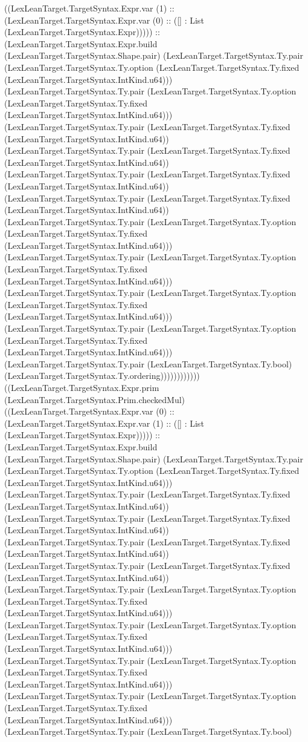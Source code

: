 \documentclass[11pt]{article}
\begin{document}
((LexLeanTarget.TargetSyntax.Expr.var (1) :: (LexLeanTarget.TargetSyntax.Expr.var (0) :: ([] : List (LexLeanTarget.TargetSyntax.Expr))))) :: (LexLeanTarget.TargetSyntax.Expr.build (LexLeanTarget.TargetSyntax.Shape.pair) (LexLeanTarget.TargetSyntax.Ty.pair (LexLeanTarget.TargetSyntax.Ty.option (LexLeanTarget.TargetSyntax.Ty.fixed (LexLeanTarget.TargetSyntax.IntKind.u64))) (LexLeanTarget.TargetSyntax.Ty.pair (LexLeanTarget.TargetSyntax.Ty.option (LexLeanTarget.TargetSyntax.Ty.fixed (LexLeanTarget.TargetSyntax.IntKind.u64))) (LexLeanTarget.TargetSyntax.Ty.pair (LexLeanTarget.TargetSyntax.Ty.fixed (LexLeanTarget.TargetSyntax.IntKind.u64)) (LexLeanTarget.TargetSyntax.Ty.pair (LexLeanTarget.TargetSyntax.Ty.fixed (LexLeanTarget.TargetSyntax.IntKind.u64)) (LexLeanTarget.TargetSyntax.Ty.pair (LexLeanTarget.TargetSyntax.Ty.fixed (LexLeanTarget.TargetSyntax.IntKind.u64)) (LexLeanTarget.TargetSyntax.Ty.pair (LexLeanTarget.TargetSyntax.Ty.fixed (LexLeanTarget.TargetSyntax.IntKind.u64)) (LexLeanTarget.TargetSyntax.Ty.pair (LexLeanTarget.TargetSyntax.Ty.option (LexLeanTarget.TargetSyntax.Ty.fixed (LexLeanTarget.TargetSyntax.IntKind.u64))) (LexLeanTarget.TargetSyntax.Ty.pair (LexLeanTarget.TargetSyntax.Ty.option (LexLeanTarget.TargetSyntax.Ty.fixed (LexLeanTarget.TargetSyntax.IntKind.u64))) (LexLeanTarget.TargetSyntax.Ty.pair (LexLeanTarget.TargetSyntax.Ty.option (LexLeanTarget.TargetSyntax.Ty.fixed (LexLeanTarget.TargetSyntax.IntKind.u64))) (LexLeanTarget.TargetSyntax.Ty.pair (LexLeanTarget.TargetSyntax.Ty.option (LexLeanTarget.TargetSyntax.Ty.fixed (LexLeanTarget.TargetSyntax.IntKind.u64))) (LexLeanTarget.TargetSyntax.Ty.pair (LexLeanTarget.TargetSyntax.Ty.bool) (LexLeanTarget.TargetSyntax.Ty.ordering)))))))))))) ((LexLeanTarget.TargetSyntax.Expr.prim (LexLeanTarget.TargetSyntax.Prim.checkedMul) ((LexLeanTarget.TargetSyntax.Expr.var (0) :: (LexLeanTarget.TargetSyntax.Expr.var (1) :: ([] : List (LexLeanTarget.TargetSyntax.Expr))))) :: (LexLeanTarget.TargetSyntax.Expr.build (LexLeanTarget.TargetSyntax.Shape.pair) (LexLeanTarget.TargetSyntax.Ty.pair (LexLeanTarget.TargetSyntax.Ty.option (LexLeanTarget.TargetSyntax.Ty.fixed (LexLeanTarget.TargetSyntax.IntKind.u64))) (LexLeanTarget.TargetSyntax.Ty.pair (LexLeanTarget.TargetSyntax.Ty.fixed (LexLeanTarget.TargetSyntax.IntKind.u64)) (LexLeanTarget.TargetSyntax.Ty.pair (LexLeanTarget.TargetSyntax.Ty.fixed (LexLeanTarget.TargetSyntax.IntKind.u64)) (LexLeanTarget.TargetSyntax.Ty.pair (LexLeanTarget.TargetSyntax.Ty.fixed (LexLeanTarget.TargetSyntax.IntKind.u64)) (LexLeanTarget.TargetSyntax.Ty.pair (LexLeanTarget.TargetSyntax.Ty.fixed (LexLeanTarget.TargetSyntax.IntKind.u64)) (LexLeanTarget.TargetSyntax.Ty.pair (LexLeanTarget.TargetSyntax.Ty.option (LexLeanTarget.TargetSyntax.Ty.fixed (LexLeanTarget.TargetSyntax.IntKind.u64))) (LexLeanTarget.TargetSyntax.Ty.pair (LexLeanTarget.TargetSyntax.Ty.option (LexLeanTarget.TargetSyntax.Ty.fixed (LexLeanTarget.TargetSyntax.IntKind.u64))) (LexLeanTarget.TargetSyntax.Ty.pair (LexLeanTarget.TargetSyntax.Ty.option (LexLeanTarget.TargetSyntax.Ty.fixed (LexLeanTarget.TargetSyntax.IntKind.u64))) (LexLeanTarget.TargetSyntax.Ty.pair (LexLeanTarget.TargetSyntax.Ty.option (LexLeanTarget.TargetSyntax.Ty.fixed (LexLeanTarget.TargetSyntax.IntKind.u64))) (LexLeanTarget.TargetSyntax.Ty.pair (LexLeanTarget.TargetSyntax.Ty.bool) 
\end{document}

